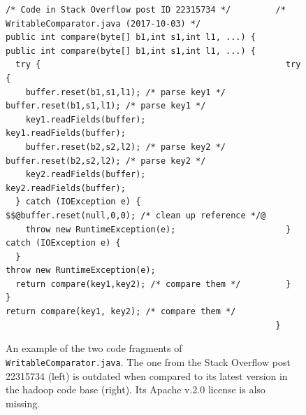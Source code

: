\documentclass[10pt,journal,compsoc]{IEEEtran}
\begin{document}
\begin{figure}
	\begin{lstlisting}
/* Code in Stack Overflow post ID 22315734 */         /* WritableComparator.java (2017-10-03) */
public int compare(byte[] b1,int s1,int l1, ...) {    public int compare(byte[] b1,int s1,int l1, ...) {
  try {                                                 try {
    buffer.reset(b1,s1,l1); /* parse key1 */              buffer.reset(b1,s1,l1); /* parse key1 */
    key1.readFields(buffer);                              key1.readFields(buffer);
    buffer.reset(b2,s2,l2); /* parse key2 */              buffer.reset(b2,s2,l2); /* parse key2 */
    key2.readFields(buffer);                              key2.readFields(buffer);
  } catch (IOException e) {                               $$@buffer.reset(null,0,0); /* clean up reference */@
    throw new RuntimeException(e);                      } catch (IOException e) {
  }                                                       throw new RuntimeException(e);
  return compare(key1,key2); /* compare them */         }
}                                                       return compare(key1, key2); /* compare them */
                                                      }
	\end{lstlisting}\vspace{-2ex}
	\caption{An example of the two code fragments of
		{\small\texttt{WritableComparator.java}}. The one from the
		Stack Overflow post 22315734 (left) is outdated when compared to
		its latest version in the \textsf{hadoop} code base
		(right). Its Apache v.2.0 license is also missing.}
	\label{fig:before-after}
\end{figure}
\end{document}
